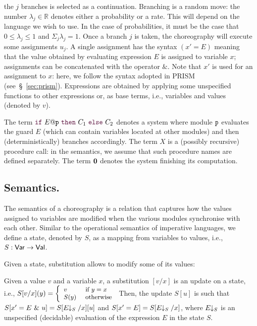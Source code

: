 the $j$ branches is selected as a continuation. Branching is a random
move: the number $\lambda_j\in\mathbb R$ denotes either a probability
or a rate. This will depend on the language we wish to use. In the
case of probabilities, it must be the case that $0\leq\lambda_j\leq 1$
and $\Sigma_j\lambda_j=1$. Once a branch $j$ is taken, the
choreography will execute some assignments $u_j$. A single assignment
has the syntax $(x' = E)$ meaning that the value obtained by
evaluating expression $E$ is assigned to variable $x$; assignments can
be concatenated with the operator $\&$.  Note that $x'$ is used for an
assignment to $x$: here, we follow the syntax adopted in PRISM
(see~\S~\ref{sec:prism}). Expressions are obtained by applying some
unspecified functions to other expressions or, as base terms, i.e.,
variables and values (denoted by $v$).
%

The term $\ifTE {E}{p}{C_1}{C_2}$ denotes a system where module
  $\mathtt{p}$ evaluates the guard $E$ (which can contain variables
  located at other modules) and then (deterministically) branches
  accordingly.  The term $X$ is a (possibly recursive) procedure call:
  in the semantics, we assume that such procedure names are defined
  separately.  The term $\mathbf{0}$ denotes the system finishing its
  computation.

\bigskip


\subsection{Semantics.} The semantics of a choreography is a relation
that captures how the values assigned to variables are modified when
the various modules synchronise with each other. Similar to the
operational semantics of imperative languages, we define a state,
denoted by $S$, as a mapping from variables to values, i.e.,
$S: \mathsf{Var} \rightarrow\mathsf{Val}$.
%

Given a state, substitution allows to modify some of its values:
%
\begin{definition}
  Given a value $v$ and a variable $x$, a substitution $[v/x]$ is an
  update on a state, i.e., $\small S[v/x] (y)= \left\{
  \begin{array}{ll} 
    v    & \text{ if } y=x\\ 
    S(y) & \text{ otherwise}
  \end{array} \right.
$
%
Then, the update $S[u]$ is such that
$S[x'=E\ \&\ u] = S[E\!\!\downarrow_{S}/x][u]$ and $S[x'=E] = S[E\!\!\downarrow_{S}/x]$,
where $E\!\!\downarrow_{S}$ is an unspecified (decidable) evaluation of the
expression $E$ in the state $S$.
\end{definition}

